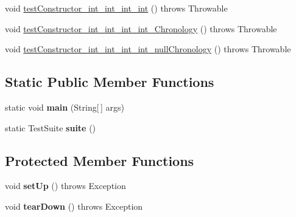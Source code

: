 \begin{DoxyCompactItemize}
void \hyperlink{classorg_1_1joda_1_1time_1_1_test_time_of_day___constructors_ae5379b649ef01be5472425f23622ff51}{test\-Constructor\-\_\-int\-\_\-int\-\_\-int\-\_\-int} ()  throws Throwable 
\item 
void \hyperlink{classorg_1_1joda_1_1time_1_1_test_time_of_day___constructors_a86e507d568fd8eff1790036bbb46d139}{test\-Constructor\-\_\-int\-\_\-int\-\_\-int\-\_\-int\-\_\-\-Chronology} ()  throws Throwable 
\item 
void \hyperlink{classorg_1_1joda_1_1time_1_1_test_time_of_day___constructors_a0de34fde8899b3ae0ee0aec1a649e2d3}{test\-Constructor\-\_\-int\-\_\-int\-\_\-int\-\_\-int\-\_\-null\-Chronology} ()  throws Throwable 
\end{DoxyCompactItemize}
\subsection*{Static Public Member Functions}
\begin{DoxyCompactItemize}
\item 
\hypertarget{classorg_1_1joda_1_1time_1_1_test_time_of_day___constructors_afdfc3372629de7241db4aa1638bef7f2}{static void {\bfseries main} (String\mbox{[}$\,$\mbox{]} args)}\label{classorg_1_1joda_1_1time_1_1_test_time_of_day___constructors_afdfc3372629de7241db4aa1638bef7f2}

\item 
\hypertarget{classorg_1_1joda_1_1time_1_1_test_time_of_day___constructors_ad099fd8693be78c61d66a766a6b7f99f}{static Test\-Suite {\bfseries suite} ()}\label{classorg_1_1joda_1_1time_1_1_test_time_of_day___constructors_ad099fd8693be78c61d66a766a6b7f99f}

\end{DoxyCompactItemize}
\subsection*{Protected Member Functions}
\begin{DoxyCompactItemize}
\item 
\hypertarget{classorg_1_1joda_1_1time_1_1_test_time_of_day___constructors_a06b771168c45ae52abcb22f3c7f7b29b}{void {\bfseries set\-Up} ()  throws Exception }\label{classorg_1_1joda_1_1time_1_1_test_time_of_day___constructors_a06b771168c45ae52abcb22f3c7f7b29b}

\item 
\hypertarget{classorg_1_1joda_1_1time_1_1_test_time_of_day___constructors_abf782917591bac7a2ee8c8d289676792}{void {\bfseries tear\-Down} ()  throws Exception }\label{classorg_1_1joda_1_1time_1_1_test_time_of_day___constructors_abf782917591bac7a2ee8c8d289676792}

\end{DoxyCompactItemize}


